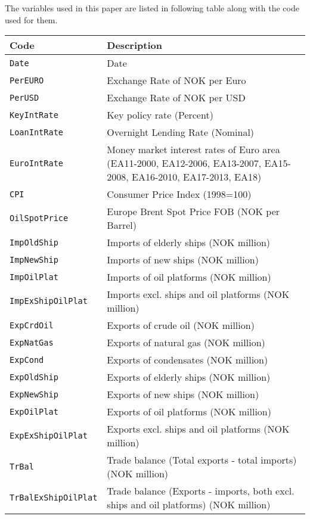 \documentclass[12pt, lot, lof]{thesis}\usepackage[]{graphicx}\usepackage[]{color}
\begin{document}
The variables used in this paper are listed in following table along with the code used for them.
\begin{tabularx}{\textwidth}{lX}
  \toprule
Code & Description \\ 
  \hline \endhead  \midrule
\texttt{Date} & Date \\ 
  \texttt{PerEURO} & Exchange Rate of NOK per Euro \\ 
  \texttt{PerUSD} & Exchange Rate of NOK per USD \\ 
  \texttt{KeyIntRate} & Key policy rate (Percent) \\ 
  \texttt{LoanIntRate} & Overnight Lending Rate (Nominal) \\ 
  \texttt{EuroIntRate} & Money market interest rates of Euro area (EA11-2000, EA12-2006, EA13-2007, EA15-2008, EA16-2010, EA17-2013, EA18) \\ 
  \texttt{CPI} & Consumer Price Index (1998=100) \\ 
  \texttt{OilSpotPrice} & Europe Brent Spot Price FOB (NOK per Barrel) \\ 
  \texttt{ImpOldShip} & Imports of elderly ships (NOK million) \\ 
  \texttt{ImpNewShip} & Imports of new ships (NOK million) \\ 
  \texttt{ImpOilPlat} & Imports of oil platforms (NOK million) \\ 
  \texttt{ImpExShipOilPlat} & Imports excl. ships and oil platforms (NOK million) \\ 
  \texttt{ExpCrdOil} & Exports of crude oil (NOK million) \\ 
  \texttt{ExpNatGas} & Exports of natural gas (NOK million) \\ 
  \texttt{ExpCond} & Exports of condensates (NOK million) \\ 
  \texttt{ExpOldShip} & Exports of elderly ships (NOK million) \\ 
  \texttt{ExpNewShip} & Exports of new ships (NOK million) \\ 
  \texttt{ExpOilPlat} & Exports of oil platforms (NOK million) \\ 
  \texttt{ExpExShipOilPlat} & Exports excl. ships and oil platforms (NOK million) \\ 
  \texttt{TrBal} & Trade balance (Total exports - total imports) (NOK million) \\ 
  \texttt{TrBalExShipOilPlat} & Trade balance (Exports - imports, both excl. ships and oil platforms) (NOK million) \\ 

\end{tabularx}
\end{document}
